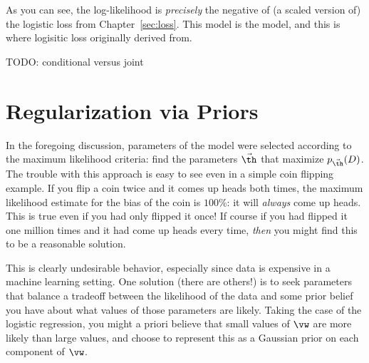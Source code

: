 As you can see, the log-likelihood is \emph{precisely} the negative of
(a scaled version of) the logistic loss from Chapter~\ref{sec:loss}.
This model is the  model, and this is
where logisitic loss originally derived from.


TODO: conditional versus joint

\section{Regularization via Priors}

In the foregoing discussion, parameters of the model were selected
according to the maximum likelihood criteria: find the parameters
$\vec\th$ that maximize $p_{\vec\th}(D)$.  The trouble with this
approach is easy to see even in a simple coin flipping example.  If
you flip a coin twice and it comes up heads both times, the maximum
likelihood estimate for the bias of the coin is $100\%$: it will
\emph{always} come up heads.  This is true even if you had only
flipped it once!  If course if you had flipped it one million times
and it had come up heads every time, \emph{then} you might find this
to be a reasonable solution.

This is clearly undesirable behavior, especially since data is
expensive in a machine learning setting.  One solution (there are
others!) is to seek parameters that balance a tradeoff between the
likelihood of the data and some prior belief you have about what
values of those parameters are likely.  Taking the case of the
logistic regression, you might a priori believe that small values of
$\vw$ are more likely than large values, and choose to represent this
as a Gaussian prior on each component of $\vw$.

